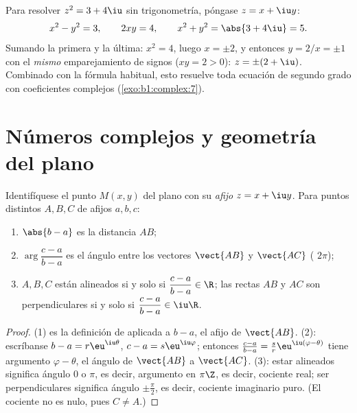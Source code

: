 \begin{example}\label{ex:b1:complex:sqrt}
Para resolver $z^2 = 3 + 4\iu$ sin trigonometría, póngase $z = x + \iu y$:
\[
x^2 - y^2 = 3, \qquad 2xy = 4, \qquad x^2 + y^2 = \abs{3 + 4\iu} = 5 .
\]
Sumando la primera y la última: $x^2 = 4$, luego $x = \pm 2$, y
entonces $y = 2/x = \pm 1$ con el \emph{mismo} emparejamiento de signos
($xy = 2 > 0$): $z = \pm(2 + \iu)$. Combinado con la fórmula habitual,
esto resuelve toda ecuación de segundo grado con coeficientes complejos
(\cref{exo:b1:complex:7}).
\end{example}

\section{Números complejos y geometría del plano}

\begin{proposition}\label{prop:b1:complex:geometry}
Identifíquese el punto $M(x, y)$ del plano con su \emph{afijo}
$z = x + \iu y$. Para puntos distintos $A, B, C$ de afijos
$a, b, c$:
\begin{enumerate}
  \item $\abs{b - a}$ es la distancia $AB$;
  \item $\arg\dfrac{c - a}{b - a}$ es el ángulo entre los vectores
        $\vect{AB}$ y $\vect{AC}$ ( $2\pi$);
  \item $A, B, C$ están alineados si y solo si $\dfrac{c - a}{b - a} \in
        \R$; las rectas $AB$ y $AC$ son perpendiculares si y solo si
        $\dfrac{c - a}{b - a} \in \iu\R$.
\end{enumerate}
\end{proposition}

\begin{proof}
(1) es la definición de  aplicada a $b - a$, el afijo de
$\vect{AB}$. (2): escríbanse $b - a = r\eu^{\iu\theta}$,
$c - a = s\eu^{\iu\varphi}$; entonces $\frac{c-a}{b-a} = \frac sr
\eu^{\iu(\varphi - \theta)}$ tiene argumento $\varphi - \theta$, el
ángulo de $\vect{AB}$ a $\vect{AC}$. (3): estar alineados significa
ángulo $0$ o $\pi$, es decir, argumento en $\pi\Z$, es decir, cociente
real; ser perpendiculares significa ángulo $\pm\frac\pi2$, es decir,
cociente imaginario puro. (El cociente no es nulo, pues $C \neq A$.)
\end{proof}

